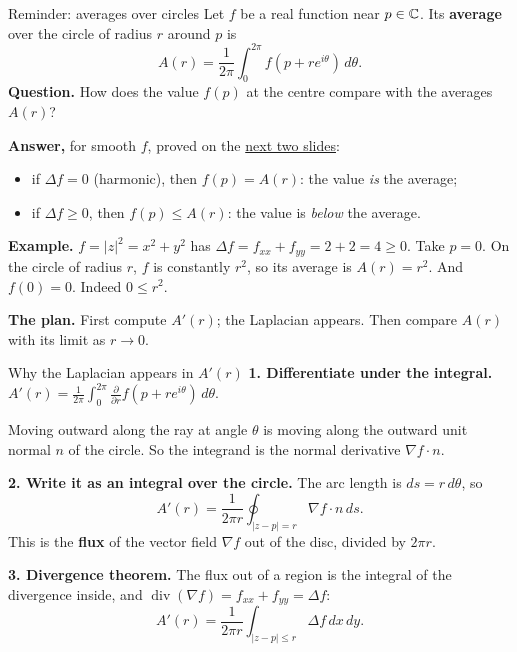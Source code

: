 \begin{frame}{Reminder: averages over circles}
Let \(f\) be a real function near \(p\in\mathbb C\). Its \textbf{average} over the circle of radius \(r\) around \(p\) is
\[
A(r)=\frac{1}{2\pi}\int_0^{2\pi}f(p+re^{i\theta})\,d\theta .
\]
\textbf{Question.} How does the value \(f(p)\) at the centre compare with the averages \(A(r)\)?
\par\medskip
\textbf{Answer,} for smooth \(f\), proved on the \hyperlink{fr:laplacian-appears}{next two slides}:
\begin{itemize}
\setlength{\itemsep}{6pt}
\item if \(\Delta f=0\) (harmonic), then \(f(p)=A(r)\): the value \emph{is} the average;
\item if \(\Delta f\ge0\), then \(f(p)\le A(r)\): the value is \emph{below} the average.
\end{itemize}
\par\medskip
\textbf{Example.} \(f=|z|^2=x^2+y^2\) has \(\Delta f=f_{xx}+f_{yy}=2+2=4\ge0\). Take \(p=0\). On the circle of radius \(r\), \(f\) is constantly \(r^2\), so its average is \(A(r)=r^2\). And \(f(0)=0\). Indeed \(0\le r^2\).
\par\medskip
\textbf{The plan.} First compute \(A'(r)\); the Laplacian appears. Then compare \(A(r)\) with its limit as \(r\to0\).
\end{frame}

\begin{frame}{Why the Laplacian appears in \(A'(r)\)}
\label{fr:laplacian-appears}
\textbf{1. Differentiate under the integral.}
\(\displaystyle A'(r)=\frac{1}{2\pi}\int_0^{2\pi}\frac{\partial}{\partial r}f(p+re^{i\theta})\,d\theta .\)
\par
Moving outward along the ray at angle \(\theta\) is moving along the outward unit normal \(n\) of the circle. So the integrand is the normal derivative \(\nabla f\cdot n\).
\par\medskip
\textbf{2. Write it as an integral over the circle.} The arc length is \(ds=r\,d\theta\), so
\[
A'(r)=\frac{1}{2\pi r}\oint_{|z-p|=r}\nabla f\cdot n\,ds .
\]
This is the \textbf{flux} of the vector field \(\nabla f\) out of the disc, divided by \(2\pi r\).
\par\medskip
\textbf{3. Divergence theorem.} The flux out of a region is the integral of the divergence inside, and \(\operatorname{div}(\nabla f)=f_{xx}+f_{yy}=\Delta f\):
\[
\boxed{A'(r)=\frac{1}{2\pi r}\int_{|z-p|\le r}\Delta f\,dx\,dy .}
\]
\end{frame}

